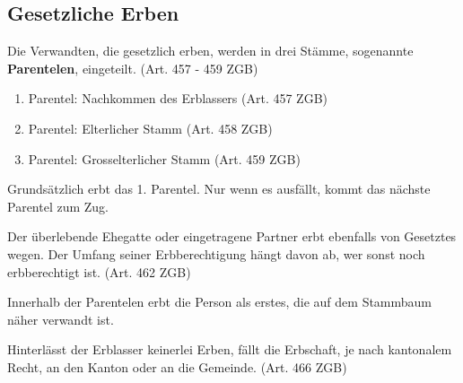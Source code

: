 \documentclass[12pt]{article}
\begin{document}
\subsection{Gesetzliche Erben}
Die Verwandten, die gesetzlich erben, werden in drei Stämme, sogenannte \textbf{Parentelen}, eingeteilt. (Art. 457 - 459 ZGB)
\begin{enumerate}
    \item Parentel: Nachkommen des Erblassers (Art. 457 ZGB)
    \item Parentel: Elterlicher Stamm (Art. 458 ZGB)
    \item Parentel: Grosselterlicher Stamm (Art. 459 ZGB)
\end{enumerate}
Grundsätzlich erbt das 1. Parentel. Nur wenn es ausfällt, kommt das nächste Parentel zum Zug.

Der überlebende Ehegatte oder eingetragene Partner erbt ebenfalls von Gesetztes wegen. Der Umfang seiner Erbberechtigung hängt davon ab, wer sonst noch erbberechtigt ist. (Art. 462 ZGB)

Innerhalb der Parentelen erbt die Person als erstes, die auf dem Stammbaum näher verwandt ist.

Hinterlässt der Erblasser keinerlei Erben, fällt die Erbschaft, je nach kantonalem Recht, an den Kanton oder an die Gemeinde. (Art. 466 ZGB)
\end{document}
